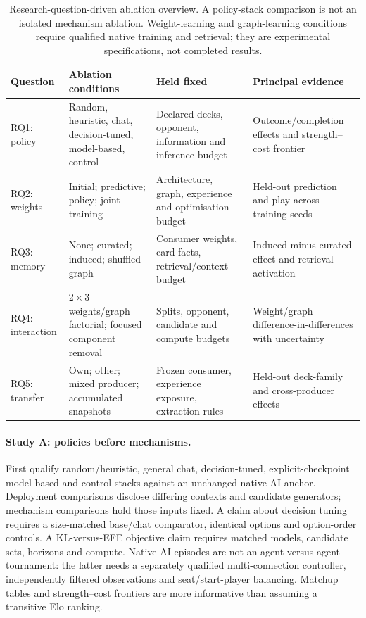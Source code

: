 \documentclass[11pt,a4paper]{article}
\theoremstyle{definition}
\theoremstyle{plain}
\begin{document}
\begin{table}[ht]
\centering
\small
\begin{tabularx}{\linewidth}{lXXX}
\toprule
Question & Ablation conditions & Held fixed & Principal evidence \\
\midrule
RQ1: policy & Random, heuristic, chat, decision-tuned, model-based, control & Declared decks, opponent, information and inference budget & Outcome/completion effects and strength--cost frontier \\
RQ2: weights & Initial; predictive; policy; joint training & Architecture, graph, experience and optimisation budget & Held-out prediction and play across training seeds \\
RQ3: memory & None; curated; induced; shuffled graph & Consumer weights, card facts, retrieval/context budget & Induced-minus-curated effect and retrieval activation \\
RQ4: interaction & $2\times3$ weights/graph factorial; focused component removal & Splits, opponent, candidate and compute budgets & Weight/graph difference-in-differences with uncertainty \\
RQ5: transfer & Own; other; mixed producer; accumulated snapshots & Frozen consumer, experience exposure, extraction rules & Held-out deck-family and cross-producer effects \\
\bottomrule
\end{tabularx}
\caption{Research-question-driven ablation overview. A policy-stack
comparison is not an isolated mechanism ablation. Weight-learning and
graph-learning conditions require qualified native training and retrieval;
they are experimental specifications, not completed results.}
\label{tab:study-ablations}
\end{table}

\paragraph{Study A: policies before mechanisms.}
First qualify random/heuristic, general chat, decision-tuned, explicit-checkpoint
model-based and control stacks against an unchanged native-AI anchor.
Deployment comparisons disclose differing contexts and candidate generators;
mechanism comparisons hold those inputs fixed. A claim about decision tuning
requires a size-matched base/chat comparator, identical options and
option-order controls. A KL-versus-EFE objective claim requires matched models,
candidate sets, horizons and compute. Native-AI episodes are not an
agent-versus-agent tournament: the latter needs a separately qualified
multi-connection controller, independently filtered observations and
seat/start-player balancing. Matchup tables and strength--cost frontiers
are more informative than assuming a transitive Elo ranking.
\end{document}
